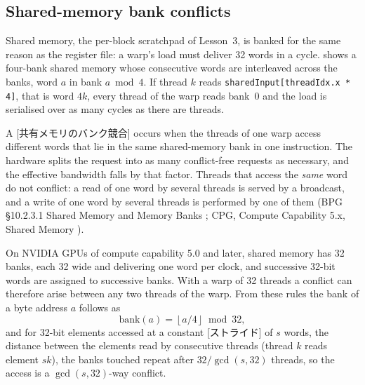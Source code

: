 \documentclass[../main.tex]{subfiles}
\begin{document}
\subsection{Shared-memory bank conflicts}

Shared memory, the per-block scratchpad of Lesson~3, is banked for the
same reason as the register file: a warp's load must deliver 32 words
in a cycle.   shows a four-bank shared memory
whose consecutive words are interleaved across the banks, word $a$ in
bank $a \bmod 4$.  If thread $k$ reads
\texttt{sharedInput[threadIdx.x * 4]}, that is word $4k$, every thread
of the warp reads bank~0 and the load is serialised over as many cycles
as there are threads.

\begin{marginfigure}
  
  \caption{Four shared-memory banks with interleaved words; a stride of
    four words sends every thread to bank~0.}
  \label{fig:l04-shared-banks}
\end{marginfigure}

\begin{definition}
  \label{def:l04-smem-bank-conflict}
  A [共有メモリのバンク競合] occurs when
  the threads of one warp access different words that lie in the same
  shared-memory bank in one instruction.  The hardware splits the
  request into as many conflict-free requests as necessary, and the
  effective bandwidth falls by that factor.  Threads that access the
  \emph{same} word do not conflict: a read of one word by several
  threads is served by a broadcast, and a write of one word by several
  threads is performed by one of them (BPG §10.2.3.1 Shared Memory and
  Memory Banks \cite{nvidia2026cudabestpractices}; CPG, Compute
  Capability 5.x, Shared Memory \cite{nvidia2024cudaguide}).
\end{definition}

On NVIDIA GPUs of compute capability 5.0 and later, shared memory has
32 banks, each \SI{32}{\bit} wide and delivering one word per clock,
and successive 32-bit words are assigned to successive banks.  With a
warp of 32 threads a conflict can therefore arise between any two
threads of the warp.  From these rules the bank of a byte address
$a$ follows as
\begin{equation}
  \text{bank}(a) = \left\lfloor a / 4 \right\rfloor \bmod 32,
  \label{eq:l04-bank}
\end{equation}
and for 32-bit elements accessed at a constant
[ストライド] of $s$ words, the distance between the
elements read by consecutive threads (thread $k$ reads element $sk$),
the banks touched
repeat after $32 / \gcd(s, 32)$ threads, so the access is a
$\gcd(s, 32)$-way conflict.
\end{document}

